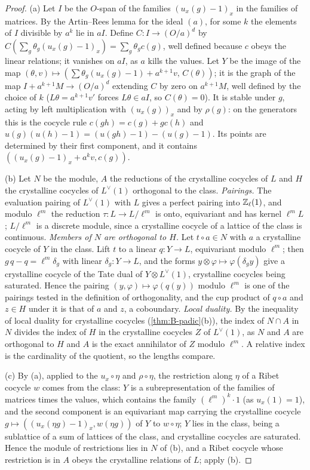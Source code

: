 \begin{proof}
(a) Let $I$ be the $O$-span of the families $(u_x(g)-1)_x$ in the families of matrices. By the Artin--Rees lemma for the ideal $(a)$, for some $k$ the elements of $I$ divisible by $a^{k}$ lie in $aI$. Define $C\colon I\to(O/a)^d$ by
$C(\sum_g\theta_g(u_x(g)-1)_x)=\sum_g\theta_gc(g)$, well defined because $c$ obeys the linear relations; it vanishes on $aI$, as $a$ kills the values. Let $Y$ be the image of the map $(\theta,v)\mapsto(\sum\theta_g(u_x(g)-1)+a^{k+1}v,\,C(\theta))$; it is the graph of the map
$I+a^{k+1}M\to(O/a)^d$ extending $C$ by zero on $a^{k+1}M$, well defined by the choice of $k$ ($L\theta=a^{k+1}v'$ forces $L\theta\in aI$, so $C(\theta)=0$). It is stable under $g$, acting by left multiplication with $(u_x(g))_x$ and by $\rho(g)$: on the
generators this is the cocycle rule $c(gh)=c(g)+gc(h)$ and $u(g)(u(h)-1)=(u(gh)-1)-(u(g)-1)$. Its points are determined by their first component, and it contains $((u_x(g)-1)_x+a^kv,c(g))$.

(b) Let $N$ be the module, $A$ the reductions of the crystalline cocycles of $L$ and $H$ the crystalline cocycles of $L^\vee(1)$ orthogonal to the class. \emph{Pairings.} The evaluation pairing of $L^\vee(1)$ with $L$ gives a perfect pairing into
$\mathbb{Z}_\ell(1)$, and modulo $\ell^m$ the reduction $\tau\colon L\to L/\ell^m$ is onto, equivariant and has kernel $\ell^mL$; $L/\ell^m$ is a discrete module, since a crystalline cocycle of a lattice of the class is continuous. \emph{Members of $N$ are
orthogonal to $H$.} Let $t\circ a\in N$ with $a$ a crystalline cocycle of $Y$ in the class. Lift $t$ to a linear $q\colon Y\to L$, equivariant modulo $\ell^m$; then $g\,q-q=\ell^m\delta_g$ with linear $\delta_g\colon Y\to L$, and the forms $y\otimes\varphi\mapsto\varphi(\delta_gy)$ give
a crystalline cocycle of the Tate dual of $Y\otimes L^\vee(1)$, crystalline cocycles being saturated. Hence the pairing $(y,\varphi)\mapsto\varphi(q(y))$ modulo $\ell^m$ is one of the pairings tested in the definition of orthogonality, and the cup product of $q\circ a$
and $z\in H$ under it is that of $a$ and $z$, a coboundary. \emph{Local duality.} By the inequality of local duality for crystalline cocycles (\cref{thm:B-padic}(b)), the index of $N\cap A$ in $N$ divides the index of $H$ in the crystalline cocycles $Z$ of
$L^\vee(1)$, as $N$ and $A$ are orthogonal to $H$ and $A$ is the exact annihilator of $Z$ modulo $\ell^m$. A relative index is the cardinality of the quotient, so the lengths compare.

(c) By (a), applied to the $u_x\circ\eta$ and $\rho\circ\eta$, the restriction along $\eta$ of a Ribet cocycle $w$ comes from the class: $Y$ is a subrepresentation of the families of matrices times the values, which contains the family $(\ell^m)^k\cdot1$ (as
$u_x(1)=1$), and the second component is an equivariant map carrying the crystalline cocycle $g\mapsto((u_x(\eta g)-1)_x,w(\eta g))$ of $Y$ to $w\circ\eta$; $Y$ lies in the class, being a sublattice of a sum of lattices of the class, and crystalline cocycles are saturated.
Hence the module of restrictions lies in $N$ of (b), and a Ribet cocycle whose restriction is in $A$ obeys the crystalline relations of $L$; apply (b).
\end{proof}

